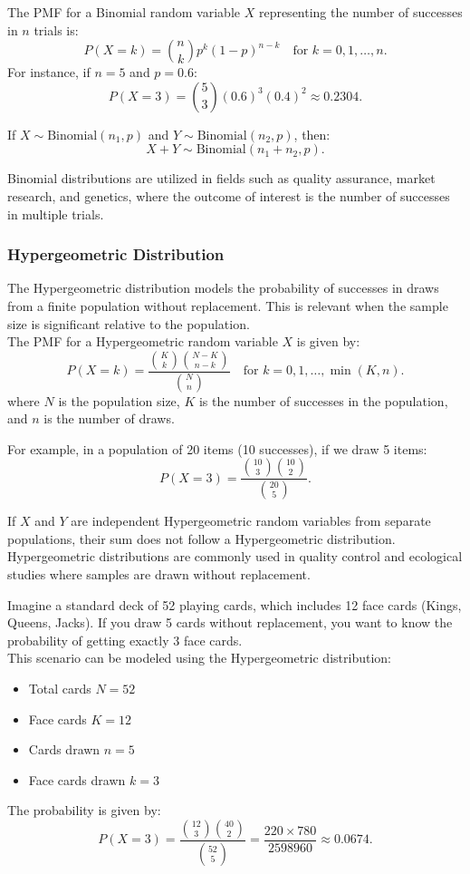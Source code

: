 The PMF for a Binomial random variable \( X \) representing the number of successes in \( n \) trials is:
\[
P(X = k) = \binom{n}{k} p^k (1 - p)^{n - k} \quad \text{for } k = 0, 1, \ldots, n.
\]
For instance, if \( n = 5 \) and \( p = 0.6 \):
\[
P(X = 3) = \binom{5}{3} (0.6)^3 (0.4)^2 \approx 0.2304.
\]

If \( X \sim \text{Binomial}(n_1, p) \) and \( Y \sim \text{Binomial}(n_2, p) \), then:
\[
X + Y \sim \text{Binomial}(n_1 + n_2, p).
\]

Binomial distributions are utilized in fields such as quality assurance, market research, and genetics, where the outcome of interest is the number of successes in multiple trials.

\subsubsection{Hypergeometric Distribution}

The Hypergeometric distribution models the probability of successes in draws from a finite population without replacement. This is relevant when the sample size is significant relative to the population.\\

The PMF for a Hypergeometric random variable \( X \) is given by:
\[
P(X = k) = \frac{\binom{K}{k} \binom{N-K}{n-k}}{\binom{N}{n}} \quad \text{for } k = 0, 1, \ldots, \min(K, n).
\]
where \( N \) is the population size, \( K \) is the number of successes in the population, and \( n \) is the number of draws.

For example, in a population of 20 items (10 successes), if we draw 5 items:
\[
P(X = 3) = \frac{\binom{10}{3} \binom{10}{2}}{\binom{20}{5}}.
\]

If \( X \) and \( Y \) are independent Hypergeometric random variables from separate populations, their sum does not follow a Hypergeometric distribution.\\

Hypergeometric distributions are commonly used in quality control and ecological studies where samples are drawn without replacement.

\begin{example}
    Imagine a standard deck of 52 playing cards, which includes 12 face cards (Kings, Queens, Jacks). If you draw 5 cards without replacement, you want to know the probability of getting exactly 3 face cards.\\

    This scenario can be modeled using the Hypergeometric distribution:
    \begin{itemize}
        \item Total cards \( N = 52 \)
        \item Face cards \( K = 12 \)
        \item Cards drawn \( n = 5 \)
        \item Face cards drawn \( k = 3 \)
    \end{itemize}

    The probability is given by:
\[
P(X = 3) = \frac{\binom{12}{3} \binom{40}{2}}{\binom{52}{5}} = \frac{220 \times 780}{2598960} \approx 0.0674.
\]
\end{example}


